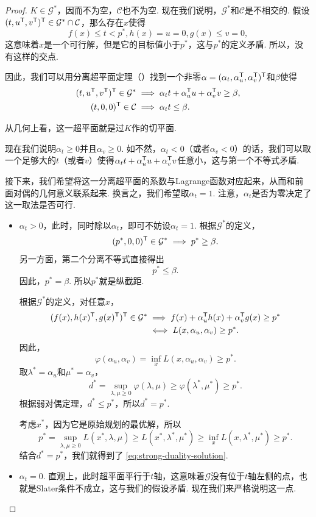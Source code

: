 \begin{proof}
    $K\in\mathcal G^*$，因而不为空，$\mathcal{C}$也不为空. 现在我们说明，$\mathcal G^*$和$\mathcal C$是不相交的. 假设$(t,u^{\mathsf{T}},v^{\mathsf{T}})^{\mathsf{T}}\in\mathcal G^*\cap \mathcal C$，那么存在$x$使得
    \[f(x)\leq t<p^*, h(x)=u=0, g(x)\leq v=0,\]
    这意味着$x$是一个可行解，但是它的目标值小于$p^*$，这与$p^*$的定义矛盾. 所以，没有这样的交点. 

    因此，我们可以用分离超平面定理（）找到一个非零$\alpha=(\alpha_t,\alpha_u^{\mathsf{T}},\alpha_v^{\mathsf{T}})^{\mathsf{T}}$和$\beta$使得
    \begin{align*}
        (t,u^{\mathsf{T}},v^{\mathsf{T}})^{\mathsf{T}}\in\mathcal G^*&\implies \alpha_t t+\alpha_u^{\mathsf{T}} u+\alpha_v^{\mathsf{T}} v\geq \beta,\\
        (t,0,0)^{\mathsf{T}}\in\mathcal C&\implies \alpha_t t\leq \beta.
    \end{align*}

    从几何上看，这一超平面就是过$K$作的切平面. 

    现在我们说明$\alpha_t\geq 0$并且$\alpha_v\geq 0$. 如不然，$\alpha_t<0$（或者$\alpha_v<0$）的话，我们可以取一个足够大的$t$（或者$v$）使得$\alpha_t t+\alpha_u^{\mathsf{T}} u+\alpha_v^{\mathsf{T}} v$任意小，这与第一个不等式矛盾.

    接下来，我们希望将这一分离超平面的系数与Lagrange函数对应起来，从而和前面对偶的几何意义联系起来. 换言之，我们希望取$\alpha_t=1$. 注意，$\alpha_t$是否为零决定了这一取法是否可行. 
    \begin{itemize}
        \item $\alpha_t>0$，此时，同时除以$\alpha_t$，即可不妨设$\alpha_t=1$. 根据$\mathcal G^*$的定义，
        \[(p^*,0,0)^{\mathsf{T}}\in\mathcal G^*\implies p^*\geq\beta.\]
        另一方面，第二个分离不等式直接得出
        \[p^*\leq\beta.\]
        因此，$p^*=\beta$. 所以$p^*$就是纵截距. 

        根据$\mathcal G^*$的定义，对任意$x$，
        \begin{align*}
            (f(x),h(x)^{\mathsf{T}},g(x)^{\mathsf{T}})^{\mathsf{T}}\in\mathcal G^*&\implies f(x)+\alpha_u^{\mathsf{T}} h(x)+\alpha_v^{\mathsf{T}} g(x)\geq p^*\\
            &\iff L(x,\alpha_u,\alpha_v)\geq p^*.
        \end{align*}
        因此，
        \[\varphi(\alpha_u,\alpha_v)=\inf_{x} L(x,\alpha_u,\alpha_v)\geq p^*.\]
        取$\lambda^*=\alpha_u$和$\mu^*=\alpha_v$，
        \[d^*=\sup_{\lambda,\mu\geq 0} \varphi(\lambda,\mu)\geq \varphi(\lambda^*,\mu^*)\geq p^*.\]
        根据弱对偶定理，$d^*\leq p^*$，所以$d^*=p^*$.

        考虑$x^*$，因为它是原始规划的最优解，所以
        \[p^*=\sup_{\lambda,\mu\geq 0} L(x^*,\lambda,\mu)\geq L(x^*,\lambda^*,\mu^*)\geq \inf_{x} L(x,\lambda^*,\mu^*)\geq p^*.\]
        结合$d^*=p^*$，我们就得到了 \eqref{eq:strong-duality-solution}.
        \item $\alpha_t=0$. 直观上，此时超平面平行于$t$轴，这意味着$\mathcal G$没有位于$t$轴左侧的点，也就是Slater条件不成立，这与我们的假设矛盾. 现在我们来严格说明这一点. 
        

\end{itemize}
\end{proof}

